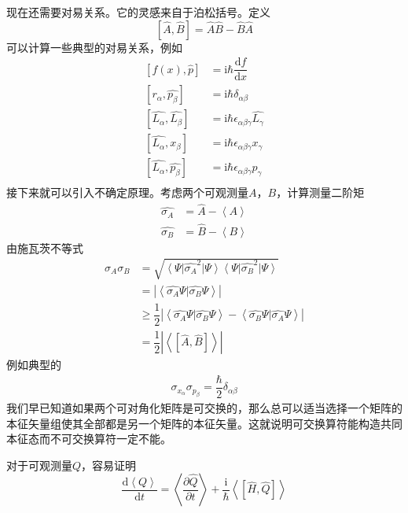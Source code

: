 \documentclass[12pt, a4paper, oneside]{ctexart}
\begin{document}
	现在还需要对易关系。它的灵感来自于泊松括号。定义
	\begin{equation}
		\left[\hat{A},\hat{B}\right]=\hat{A}\hat{B}-\hat{B}\hat{A}
	\end{equation}
	\quad\quad 可以计算一些典型的对易关系，例如
	\begin{align}
		\left[f(x),\hat{p}\right]&=\mathrm{i}\hbar\dfrac{\mathrm{d}f}{\mathrm{d}x}\\
		\left[r_{\alpha},\hat{p_{\beta}}\right]&=\mathrm{i}\hbar\delta_{\alpha\beta}\\
		\left[\hat{L_{\alpha}},\hat{L_{\beta}}\right]&=\mathrm{i}\hbar \epsilon_{\alpha\beta\gamma}\hat{L_{\gamma}}\\
		\left[\hat{L_{\alpha}},x_{\beta}\right]&=\mathrm{i}\hbar \epsilon_{\alpha\beta\gamma}x_{\gamma}\\
		\left[\hat{L_{\alpha}},\hat{p_{\beta}}\right]&=\mathrm{i}\hbar \epsilon_{\alpha\beta\gamma}\hat{p_{\gamma}}\\
	\end{align}
	\quad\quad 接下来就可以引入不确定原理。考虑两个可观测量$A$，$B$，计算测量二阶矩
	\begin{align}
		\hat{\sigma_{A}}&=\hat{A}-\left<A\right>\\
		\hat{\sigma_{B}}&=\hat{B}-\left<B\right>
	\end{align}
	\quad\quad 由施瓦茨不等式
	\begin{align}
		\sigma_{A}\sigma_{B}&=\sqrt{\left<\Psi\right|\hat{\sigma_{A}}^{2}\left|\Psi\right>\left<\Psi\right|\hat{\sigma_{B}}^{2}\left|\Psi\right>}\\
		&=\left|\left<\hat{\sigma_{A}}\Psi|\hat{\sigma_{B}}\Psi\right>\right|\\
		&\ge\dfrac{1}{2}\left|\left<\hat{\sigma_{A}}\Psi|\hat{\sigma_{B}}\Psi\right>-\left<\hat{\sigma_{B}}\Psi|\hat{\sigma_{A}}\Psi\right>\right|\\
		&=\dfrac{1}{2}\left|\left<\left[\hat{A},\hat{B}\right]\right>\right|
	\end{align}
	\quad\quad 例如典型的
	\begin{align}
		\sigma_{x_{\alpha}}\sigma_{p_{\beta}}=\dfrac{\hbar}{2}\delta_{\alpha\beta}
	\end{align}
	\quad\quad 我们早已知道如果两个可对角化矩阵是可交换的，那么总可以适当选择一个矩阵的本征矢量组使其全部都是另一个矩阵的本征矢量。这就说明可交换算符能构造共同本征态而不可交换算符一定不能。\par 
	对于可观测量$Q$，容易证明
	\begin{equation}
		\dfrac{\mathrm{d}\left<Q\right>}{\mathrm{d}t}=\left<\dfrac{\partial\hat{Q}}{\partial t}\right>+\dfrac{\mathrm{i}}{\hbar}\left<\left[\hat{H},\hat{Q}\right]\right>
	\end{equation}
\end{document}
